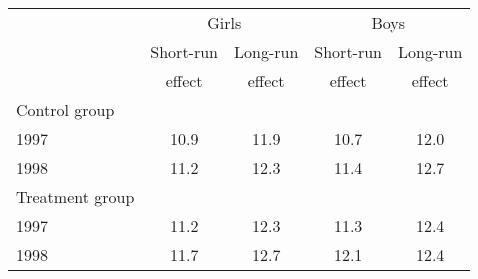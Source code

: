     \begin{tabular}{lcccc}
    \toprule
                    & \multicolumn{2}{c}{Girls} & \multicolumn{2}{c}{Boys} \\
                    \cmidrule(r){2-3}         \cmidrule(r){4-5}
                    & Short-run & Long-run      & Short-run & Long-run      \\
                    & effect    & effect        & effect    & effect        \\
    \midrule
    Control group   &           &               &           &               \\
    1997            &   10.9    &   11.9        &   10.7    &       12.0    \\
    1998            &   11.2    &   12.3        &   11.4    &       12.7    \\
    Treatment group &           &               &           &               \\
    1997            &   11.2    &   12.3        &   11.3    &       12.4    \\
    1998            &   11.7    &   12.7        &   12.1    &       12.4    \\
    \bottomrule
    \end{tabular}

